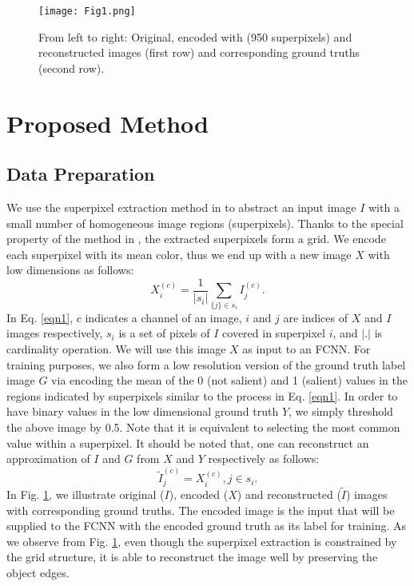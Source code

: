 \documentclass[a4paper,conference]{IEEEtran}
\begin{document}
\begin{figure}[!t]
\centering
\texttt{[image: Fig1.png]}
\caption{From left to right: Original, encoded with \cite{Fu} (950 superpixels) and reconstructed images (first row) and corresponding ground truths (second row).}
\label{fig1}
\end{figure}

\section{Proposed Method} \label{PropMet}
\subsection{Data Preparation}
We use the superpixel extraction method in \cite{Fu} to abstract an input image $ I $ with a small number of homogeneous image regions (superpixels).
Thanks to the special property of the method in \cite{Fu}, the extracted superpixels form a grid.
We encode each superpixel with its mean color, thus we end up with a new image $ X $ with low dimensions as follows:
\begin{equation}
X^{(c)}_{i}=\frac{1}{|s_{i}|}\sum_{\{j\}\in s_{i}}I^{(c)}_{j}.
\label{eqn1}
\end{equation}
In Eq. \ref{eqn1}, $ c $ indicates a channel of an image, $ i $ and $ j $ are indices of $ X $ and $ I $ images respectively, $ s_{i} $ is a set of pixels of $ I $ covered in superpixel $ i $, and $ |.| $ is cardinality operation.
We will use this image $ X $ as input to an FCNN.
For training purposes, we also form a low resolution version of the ground truth label image $ G $ via encoding the mean of the 0 (not salient) and 1 (salient) values in the regions indicated by superpixels similar to the process in Eq. \ref{eqn1}.
In order to have binary values in the low dimensional ground truth $ Y $, we simply threshold the above image by 0.5. Note that it is equivalent to selecting the most common value within a superpixel.
It should be noted that, one can reconstruct an approximation of $ I $ and $ G $ from $ X $ and $ Y $ respectively as follows:
\begin{equation}
\tilde{I}^{(c)}_{j}=X^{(c)}_{i}, j\in s_{i}.
\label{eqn2}
\end{equation}
In Fig. \ref{fig1}, we illustrate original ($ I $), encoded ($ X $) and reconstructed ($ \tilde{I} $) images with corresponding ground truths.
The encoded image is the input that will be supplied to the FCNN with the encoded ground truth as its label for training.
As we observe from Fig. \ref{fig1}, even though the superpixel extraction is constrained by the grid structure, it is able to reconstruct the image well by preserving the object edges.
\end{document}

